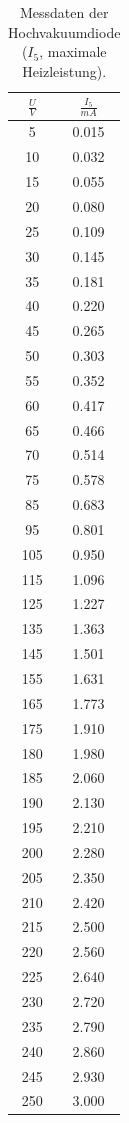 \begin{table} [H]
	\centering
	\caption{Messdaten der Hochvakuumdiode ($I_5$, maximale Heizleistung).}
	\label{tab:a2}
	\begin{tabular}{S[table-format=4.2]|c}
		\toprule
		{$\frac{U}{V}$}&{$\frac{I_5}{mA}$} \\
		 &0.015\\
		10 &0.032\\
		15 &0.055\\
		20 &0.080\\
		25 &0.109\\
		30 &0.145\\
		35 &0.181\\
		40 &0.220\\
		45 &0.265\\
		50 &0.303\\
		55 &0.352\\
		60 &0.417\\
		65 &0.466\\
		70 &0.514\\
		75 &0.578\\
		85 &0.683\\
		95 &0.801\\
		105 &0.950\\
		115 &1.096\\
		125 &1.227\\
		135 &1.363\\
		145 &1.501\\
		155 &1.631\\
		165 &1.773\\
		175 &1.910\\
		180 &1.980\\
		185 &2.060\\
		190 &2.130\\
		195 &2.210\\
		200 &2.280\\
		205 &2.350\\
		210 &2.420\\
		215 &2.500\\
		220 &2.560\\
		225 &2.640\\
		230 &2.720\\
		235 &2.790\\
		240 &2.860\\
		245 &2.930\\
		250 &3.000\\
		\bottomrule 
	\end{tabular}
\end{table} 

